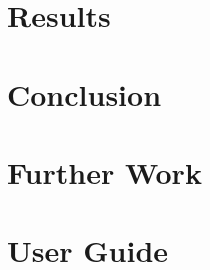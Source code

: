 \documentclass[12pt]{report}
\begin{document}
\begingroup

\setlength{\parindent}{0em}
\setlength{\parskip}{0em}


\endgroup

\begingroup





\setcounter{tocdepth}{1}
\tableofcontents
\newpage



\newpage


\newpage


\newpage






\newpage






\newpage


\chapter{Results}



\newpage
\chapter{Conclusion}

\chapter{Further Work}

\chapter{User Guide}

\newpage
\appendix


\endgroup

\newpage

\end{document}
